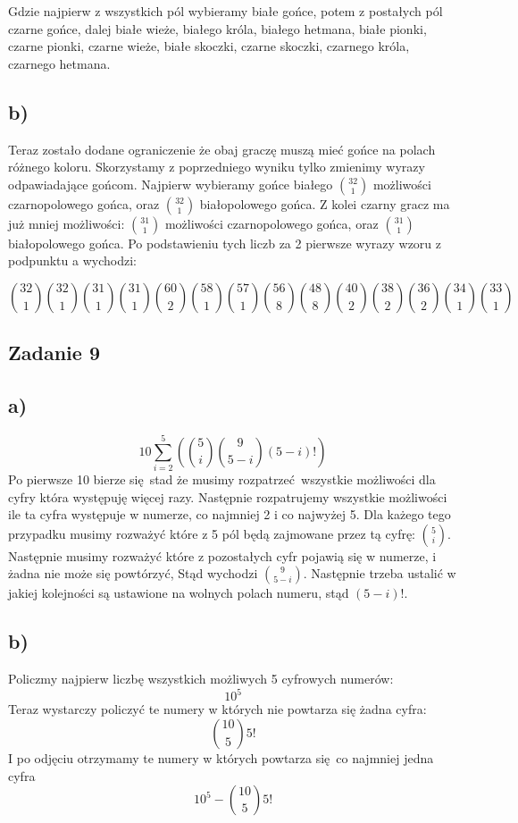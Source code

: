 \documentclass{article}
\begin{document}
Gdzie najpierw z wszystkich pól wybieramy białe gońce, potem z postałych pól czarne gońce, dalej białe wieże, białego króla, białego hetmana, białe pionki, czarne pionki, czarne wieże, białe skoczki, czarne skoczki, czarnego króla, czarnego hetmana.

\subsection*{b)}
Teraz zostało dodane ograniczenie że obaj graczę muszą mieć gońce na polach różnego koloru. Skorzystamy z poprzedniego wyniku tylko zmienimy wyrazy odpawiadające gońcom.
Najpierw wybieramy gońce białego ${32 \choose 1}$ możliwości czarnopolowego gońca, oraz
${32 \choose 1}$ białopolowego gońca. Z kolei czarny gracz ma już mniej możliwości:
${31 \choose 1}$ możliwości czarnopolowego gońca, oraz ${31 \choose 1}$  białopolowego gońca. Po podstawieniu tych liczb za 2 pierwsze wyrazy wzoru z podpunktu a wychodzi:

\[ {32 \choose 1}{32 \choose 1} {31 \choose 1} {31 \choose 1} {60 \choose 2} {58 \choose 1} {57 \choose 1} {56 \choose 8} {48 \choose 8} {40 \choose 2} {38 \choose 2} {36 \choose 2} {34 \choose 1} {33 \choose 1}\]

\subsection*{Zadanie 9}
\subsection*{a)}
\[ 10 \sum^5_{i=2} ({5 \choose i}  {9 \choose 5-i} (5-i)!)\]
Po pierwsze 10 bierze się stad że musimy rozpatrzeć wszystkie możliwości dla cyfry która występuję więcej razy. Następnie rozpatrujemy wszystkie możliwości ile ta cyfra występuje w numerze, co najmniej 2 i co najwyżej 5. Dla każego tego przypadku musimy rozważyć które z 5 pól będą zajmowane przez tą cyfrę: $5 \choose i$. Następnie musimy rozważyć które z pozostałych cyfr pojawią się w numerze, i żadna nie może się powtórzyć, Stąd wychodzi ${9 \choose 5-i} $. Następnie trzeba ustalić w jakiej kolejności są ustawione na wolnych polach numeru, stąd $(5-i)!$.

\subsection*{b)}
Policzmy najpierw liczbę wszystkich możliwych 5 cyfrowych numerów: \[10^5\] Teraz wystarczy policzyć te numery w których nie powtarza się żadna cyfra:
\[{10 \choose 5} 5!\]
I po odjęciu otrzymamy te numery w których powtarza się co najmniej jedna cyfra
\[ 10^5 - {10 \choose 5} 5!\]
\end{document}
